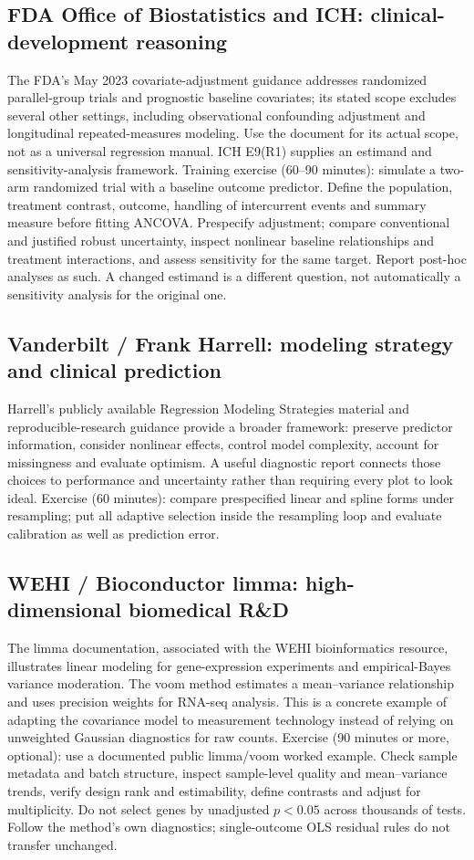 \documentclass[11pt]{article}
\begin{document}
\subsection{FDA Office of Biostatistics and ICH: clinical-development reasoning}
The FDA's May 2023 covariate-adjustment guidance addresses randomized parallel-group trials and prognostic baseline covariates; its stated scope excludes several other settings, including observational confounding adjustment and longitudinal repeated-measures modeling. Use the document for its actual scope, not as a universal regression manual. ICH E9(R1) supplies an estimand and sensitivity-analysis framework.
Training exercise (60--90 minutes): simulate a two-arm randomized trial with a baseline outcome predictor. Define the population, treatment contrast, outcome, handling of intercurrent events and summary measure before fitting ANCOVA. Prespecify adjustment; compare conventional and justified robust uncertainty, inspect nonlinear baseline relationships and treatment interactions, and assess sensitivity for the same target. Report post-hoc analyses as such. A changed estimand is a different question, not automatically a sensitivity analysis for the original one.
\subsection{Vanderbilt / Frank Harrell: modeling strategy and clinical prediction}
Harrell's publicly available Regression Modeling Strategies material and reproducible-research guidance provide a broader framework: preserve predictor information, consider nonlinear effects, control model complexity, account for missingness and evaluate optimism. A useful diagnostic report connects those choices to performance and uncertainty rather than requiring every plot to look ideal. Exercise (60 minutes): compare prespecified linear and spline forms under resampling; put all adaptive selection inside the resampling loop and evaluate calibration as well as prediction error.
\subsection{WEHI / Bioconductor limma: high-dimensional biomedical R\&D}
The limma documentation, associated with the WEHI bioinformatics resource, illustrates linear modeling for gene-expression experiments and empirical-Bayes variance moderation. The voom method estimates a mean--variance relationship and uses precision weights for RNA-seq analysis. This is a concrete example of adapting the covariance model to measurement technology instead of relying on unweighted Gaussian diagnostics for raw counts.
Exercise (90 minutes or more, optional): use a documented public limma/voom worked example. Check sample metadata and batch structure, inspect sample-level quality and mean--variance trends, verify design rank and estimability, define contrasts and adjust for multiplicity. Do not select genes by unadjusted $p<0.05$ across thousands of tests. Follow the method's own diagnostics; single-outcome OLS residual rules do not transfer unchanged.
\end{document}
